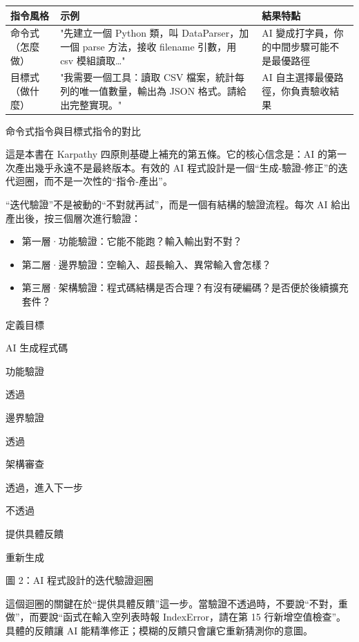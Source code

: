 \begin{center}
\begin{tabularx}{\linewidth}{|X|X|X|}
\hline
\textbf{指令風格} & \textbf{示例} & \textbf{結果特點} \tabularnewline
\hline
命令式（怎麼做） & "先建立一個 Python 類，叫 DataParser，加一個 parse 方法，接收 filename 引數，用 csv 模組讀取…" & AI 變成打字員，你的中間步驟可能不是最優路徑 \tabularnewline
目標式（做什麼） & "我需要一個工具：讀取 CSV 檔案，統計每列的唯一值數量，輸出為 JSON 格式。請給出完整實現。" & AI 自主選擇最優路徑，你負責驗收結果 \tabularnewline
\hline
\end{tabularx}
\end{center}

\begin{center}\small\color{gray}命令式指令與目標式指令的對比\end{center}


這是本書在 Karpathy 四原則基礎上補充的第五條。它的核心信念是：AI 的第一次產出幾乎永遠不是最終版本。有效的 AI 程式設計是一個“生成-驗證-修正”的迭代迴圈，而不是一次性的“指令-產出”。

“迭代驗證”不是被動的“不對就再試”，而是一個有結構的驗證流程。每次 AI 給出產出後，按三個層次進行驗證：

\begin{itemize}
  \item 第一層·功能驗證：它能不能跑？輸入輸出對不對？
  \item 第二層·邊界驗證：空輸入、超長輸入、異常輸入會怎樣？
  \item 第三層·架構驗證：程式碼結構是否合理？有沒有硬編碼？是否便於後續擴充套件？
\end{itemize}

定義目標

AI 生成程式碼

功能驗證

透過

邊界驗證

透過

架構審查

透過，進入下一步

不透過

提供具體反饋

重新生成

\begin{center}\small\color{gray}圖 2：AI 程式設計的迭代驗證迴圈\end{center}

這個迴圈的關鍵在於“提供具體反饋”這一步。當驗證不透過時，不要說“不對，重做”，而要說“函式在輸入空列表時報 IndexError，請在第 15 行新增空值檢查”。具體的反饋讓 AI 能精準修正；模糊的反饋只會讓它重新猜測你的意圖。

